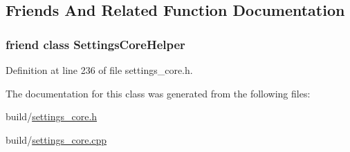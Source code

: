 \subsection{Friends And Related Function Documentation}
\hypertarget{classOkular_1_1SettingsCore_af30a1ffda174a128cef81b617a4075a5}{
\subsubsection[{Settings\+Core\+Helper}]{\setlength{\rightskip}{0pt plus 5cm}friend class {\bf Settings\+Core\+Helper}\hspace{0.3cm}{\ttfamily [friend]}}}\label{classOkular_1_1SettingsCore_af30a1ffda174a128cef81b617a4075a5}


Definition at line 236 of file settings\+\_\+core.\+h.



The documentation for this class was generated from the following files\+:\begin{DoxyCompactItemize}
\item 
build/\hyperlink{settings__core_8h}{settings\+\_\+core.\+h}\item 
build/\hyperlink{settings__core_8cpp}{settings\+\_\+core.\+cpp}\end{DoxyCompactItemize}
